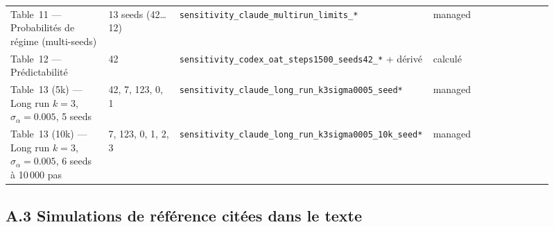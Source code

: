 \begin{longtable}{p{0.18\linewidth}p{0.13\linewidth}p{0.38\linewidth}p{0.22\linewidth}}
Table~11 — Probabilités de régime (multi-seeds)
 & 13 seeds (42…12) & \texttt{sensitivity\_claude\_multirun\_limits\_*} & managed \\

Table~12 — Prédictabilité
 & 42 & \texttt{sensitivity\_codex\_oat\_steps1500\_seeds42\_*} + dérivé & calculé \\

Table~13 (5k) — Long run $k=3$, $\sigma_\alpha=0.005$, 5 seeds
 & 42, 7, 123, 0, 1 & \texttt{sensitivity\_claude\_long\_run\_k3sigma0005\_seed*} & managed \\

Table~13 (10k) — Long run $k=3$, $\sigma_\alpha=0.005$, 6 seeds à 10\,000 pas
 & 7, 123, 0, 1, 2, 3 & \texttt{sensitivity\_claude\_long\_run\_k3sigma0005\_10k\_seed*} & managed \\

\hline
\end{longtable}

\subsection*{A.3 Simulations de référence citées dans le texte}

